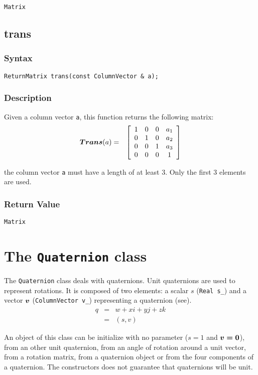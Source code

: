 \documentclass[11pt,fleqn,letterpaper]{report}
\newcommand{\mbold}[1]{\mbox{\boldmath $ #1 $}}
\newcommand{\matr}[2]{\left[\begin{array}{#1} #2 \end{array}\right]}
\begin{document}
{\tt Matrix}

\newpage

\subsection*{trans}

\subsubsection*{Syntax}
\begin{verbatim}
ReturnMatrix trans(const ColumnVector & a);
\end{verbatim}
\subsubsection{Description}
Given a column vector {\tt a}, this function returns the following matrix:
\begin{eqnarray}
\mbold{Trans}(a) & = & 
\matr{cccc}{
1 & 0 & 0 & a_1 \\
0 & 1 & 0 & a_2 \\
0 & 0 & 1 & a_3 \\
0 & 0 & 0 & 1
}
\end{eqnarray}

 the column vector {\tt a} must have a length of at least 3. 
Only the first 3 elements are used.

\subsubsection*{Return Value}

{\tt Matrix}

\newpage

\section{The \texttt{Quaternion} class}

The \texttt{Quaternion} class deals with quaternions. Unit quaternions
are used to represent rotations. It is composed of two elements: a
scalar $s$ (\texttt{Real s\_}) and a vector $\mbold{v}$
(\texttt{ColumnVector v\_}) representing a quaternion
(see\cite{Chou92}).
\begin{eqnarray}
 q & = & w + xi + yj + zk \\
   & = & (s, v) 
\end{eqnarray}

An object of this class can be initialize with no parameter ($s=1$ and
$\mbold{v=0}$), from an other unit quaternion, from an angle of
rotation around a unit vector, from a rotation matrix, from a
quaternion object or from the four components of a quaternion. The
constructors does not guarantee that quaternions will be unit.
\end{document}
